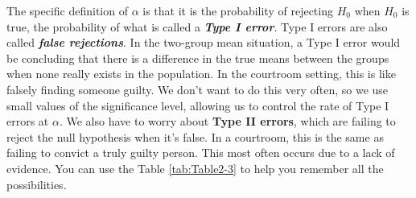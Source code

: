 \documentclass[]{book}
\theoremstyle{definition}
\theoremstyle{definition}
\theoremstyle{remark}
\begin{document}
The specific definition of \(\alpha\) is that it is the probability of
rejecting \(H_0\) when \(H_0\) is true, the probability of what is
called a \textbf{\emph{Type I error}}. Type I errors are also called
\textbf{\emph{false rejections}}. In the two-group mean situation, a
Type I error would be concluding that there is a difference in the true
means between the groups when none really exists in the population. In
the courtroom setting, this is like falsely finding someone guilty. We
don't want to do this very often, so we use small values of the
significance level, allowing us to control the rate of Type I errors at
\(\alpha\). We also have to worry about \textbf{Type II errors}, which
are failing to reject the null hypothesis when it's false. In a
courtroom, this is the same as failing to convict a truly guilty person.
This most often occurs due to a lack of evidence. You can use the Table
\ref{tab:Table2-3} to help you remember all the possibilities.
\end{document}
